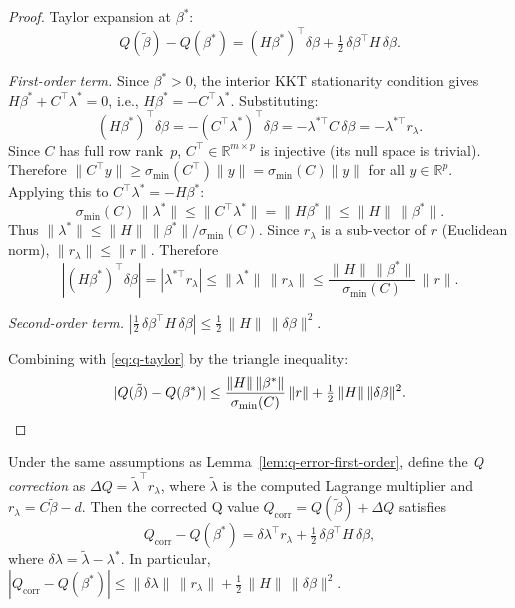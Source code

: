 \begin{proof}
Taylor expansion at $\beta^*$:
\begin{equation}\label{eq:q-taylor}
  Q(\tilde\beta) - Q(\beta^*)
  = (H\beta^*)^\top \delta\beta + \tfrac{1}{2}\,\delta\beta^\top H\,\delta\beta.
\end{equation}

\emph{First-order term.}
Since $\beta^* > 0$, the interior KKT stationarity condition gives
$H\beta^* + C^\top\lambda^* = 0$, i.e.,
$H\beta^* = -C^\top\lambda^*$. Substituting:
\begin{equation}\label{eq:first-order-rewrite}
  (H\beta^*)^\top\delta\beta
  = -(C^\top\lambda^*)^\top\delta\beta
  = -\lambda^{*\top} C\,\delta\beta
  = -\lambda^{*\top} r_\lambda.
\end{equation}
Since $C$ has full row rank~$p$, $C^\top \in \mathbb{R}^{m \times p}$
is injective (its null space is trivial). Therefore
$\|C^\top y\| \geq \sigma_{\min}(C^\top)\|y\| = \sigma_{\min}(C)\|y\|$
for all $y \in \mathbb{R}^p$. Applying this to $C^\top\lambda^* = -H\beta^*$:
\[
  \sigma_{\min}(C)\,\|\lambda^*\|
  \leq \|C^\top\lambda^*\|
  = \|H\beta^*\|
  \leq \|H\|\,\|\beta^*\|.
\]
Thus $\|\lambda^*\| \leq \|H\|\,\|\beta^*\| / \sigma_{\min}(C)$.
Since $r_\lambda$ is a sub-vector of $r$ (Euclidean norm),
$\|r_\lambda\| \leq \|r\|$.
Therefore
\[
  |(H\beta^*)^\top\delta\beta|
  = |\lambda^{*\top} r_\lambda|
  \leq \|\lambda^*\|\,\|r_\lambda\|
  \leq \frac{\|H\|\,\|\beta^*\|}{\sigma_{\min}(C)}\,\|r\|.
\]

\emph{Second-order term.}
$|\tfrac{1}{2}\,\delta\beta^\top H\,\delta\beta|
  \leq \tfrac{1}{2}\,\|H\|\,\|\delta\beta\|^2$.

Combining with \eqref{eq:q-taylor} by the triangle inequality:
\[
  |Q(\tilde\beta) - Q(\beta^*)|
  \leq \frac{\|H\|\,\|\beta^*\|}{\sigma_{\min}(C)}\,\|r\|
  + \tfrac{1}{2}\,\|H\|\,\|\delta\beta\|^2. \qedhere
\]
\end{proof}


\begin{lemma}\label{lem:q-correction-second-order}
Under the same assumptions as Lemma~\ref{lem:q-error-first-order},
define the \emph{Q correction} as $\Delta Q = \tilde\lambda^\top r_\lambda$,
where $\tilde\lambda$ is the computed Lagrange multiplier and
$r_\lambda = C\tilde\beta - d$.
Then the corrected Q value
$Q_{\mathrm{corr}} = Q(\tilde\beta) + \Delta Q$ satisfies
\[
  Q_{\mathrm{corr}} - Q(\beta^*)
  = \delta\lambda^\top r_\lambda
    + \tfrac{1}{2}\,\delta\beta^\top H\,\delta\beta,
\]
where $\delta\lambda = \tilde\lambda - \lambda^*$.
In particular,
$|Q_{\mathrm{corr}} - Q(\beta^*)|
  \leq \|\delta\lambda\|\,\|r_\lambda\|
    + \tfrac{1}{2}\,\|H\|\,\|\delta\beta\|^2$.
\end{lemma}

